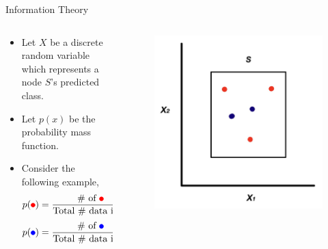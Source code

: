 \documentclass[xcolor={svgnames},
               hyperref={colorlinks,citecolor=DeepPink4,linkcolor=FireBrick,urlcolor=Maroon}]
               {beamer}
\begin{document}
  \begin{frame}{Information Theory}
      \begin{columns}[T]
        \begin{column}{.60\textwidth}
          \begin{itemize}
            \item Let $X$ be a discrete random variable which represents a node $S$'s predicted class. 
            \vfill
            \item Let $p(x)$ be the probability mass function.
            \vfill
            \item Consider the following example,
            \begin{equation*}
              p(\tikz\draw[red,fill=red] (0,0) circle (.5ex);) = \dfrac{\text{$\#$ of \tikz\draw[red,fill=red] (0,0) circle (.5ex);}}{\text{Total $\#$ data in $S$}} = \dfrac{3}{5}, 
            \end{equation*}
            \begin{equation*}
              p(\tikz\draw[blue,fill=blue] (0,0) circle (.5ex);) = \dfrac{\text{$\#$ of \tikz\draw[blue,fill=blue] (0,0) circle (.5ex);}}{\text{Total $\#$ data in $S$}} = \dfrac{2}{5}. 
            \end{equation*}
          \end{itemize}
        \end{column}
        \begin{column}{.40\textwidth}
          \begin{figure}
            \vspace*{\fill}
            \begin{center}
          \includegraphics[width=\textwidth]{NodeS.jpg}

\end{center}
\end{figure}
\end{column}
\end{columns}
\end{frame}
\end{document}
